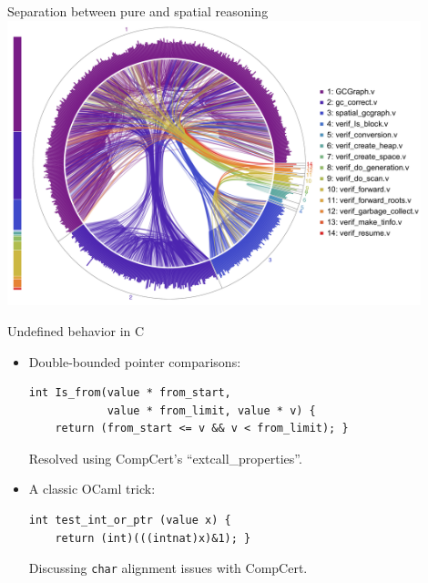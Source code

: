 \documentclass[usenames, xcolor=dvipsnames]{beamer}
\begin{document}
{\begin{frame}{Separation between pure and spatial reasoning}
  \centering
  \includegraphics[width=0.9\textwidth]{certigc_theorems.pdf}
\end{frame}

\begin{frame}[fragile]{Undefined behavior in C}

  \begin{itemize}
  \item Double-bounded pointer comparisons:
    \begin{Verbatim}
int Is_from(value * from_start,
            value * from_limit, value * v) {
    return (from_start <= v && v < from_limit); }
    \end{Verbatim}
    Resolved using CompCert's ``extcall\_properties''.
    \pause
  \item A classic OCaml trick:
    \begin{Verbatim}
int test_int_or_ptr (value x) {
    return (int)(((intnat)x)&1); }
    \end{Verbatim}
    Discussing \texttt{char} alignment issues with CompCert.
  \end{itemize}
\end{frame}}
\end{document}
